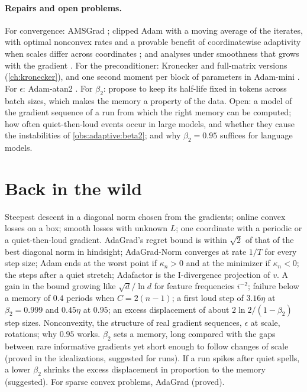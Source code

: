 \begin{refsection}
\paragraph{Repairs and open problems.} For convergence: AMSGrad \parencite{ReddiKaleKumar2018}; clipped Adam with a moving average of the iterates, with optimal nonconvex rates and a provable benefit of coordinatewise adaptivity when scales differ across coordinates \parencite{AhnCutkosky2024}; and analyses under smoothness that grows with the gradient \parencite{LiRakhlinJadbabaie2023}. For the preconditioner: Kronecker and full-matrix versions (\cref{ch:kronecker}), and one second moment per block of parameters in Adam-mini \parencite{ZhangEtAl2025}. For $\epsilon$: Adam-atan2 \parencite{EverettEtAl2024}. For $\beta_2$: \textcite{MarekEtAl2025} propose to keep its half-life fixed in tokens across batch sizes, which makes the memory a property of the data. Open: a model of the gradient sequence of a run from which the right memory can be computed; how often quiet-then-loud events occur in large models, and whether they cause the instabilities of \cref{obs:adaptive:beta2}; and why $\beta_2=0.95$ suffices for language models.

\section{Back in the wild}\label{sec:adaptive:back}

{Steepest descent in a diagonal norm chosen from the gradients; online convex losses on a box; smooth losses with unknown $L$; one coordinate with a periodic or a quiet-then-loud gradient.}
{AdaGrad's regret bound is within $\sqrt2$ of that of the best diagonal norm in hindsight; AdaGrad-Norm converges at rate $1/T$ for every step size; Adam ends at the worst point if $\kappa_n>0$ and at the minimizer if $\kappa_n<0$; the steps after a quiet stretch; Adafactor is the I-divergence projection of $v$.}
{A gain in the bound growing like $\sqrt d/\ln d$ for feature frequencies $i^{-2}$; failure below a memory of $0.4$ periods when $C=2(n-1)$; a first loud step of $3.16\eta$ at $\beta_2=0.999$ and $0.45\eta$ at $0.95$; an excess displacement of about $2\ln2/(1-\beta_2)$ step sizes.}
{Nonconvexity, the structure of real gradient sequences, $\epsilon$ at scale, rotations; why $0.95$ works.}
{$\beta_2$ sets a memory, long compared with the gaps between rare informative gradients yet short enough to follow changes of scale (proved in the idealizations, suggested for runs). If a run spikes after quiet spells, a lower $\beta_2$ shrinks the excess displacement in proportion to the memory (suggested). For sparse convex problems, AdaGrad (proved).}


\end{refsection}

